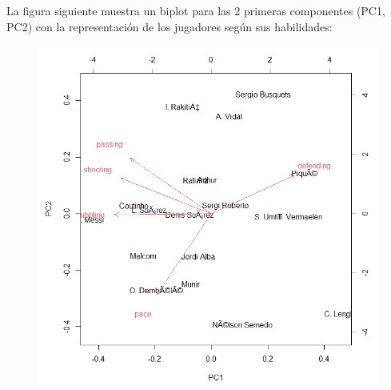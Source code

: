 \documentclass[a4paper,10pt,twocolumn]{article}
\begin{document}
La figura siguiente muestra un biplot para las 2 primeras componentes (PC1, PC2) con la representación de los jugadores según sus habilidades:

\begin{figure}[h]
	\includegraphics[scale=0.4]{./imgs/acp_biplot.png}
\end{figure}

\label{end}
\end{document}
